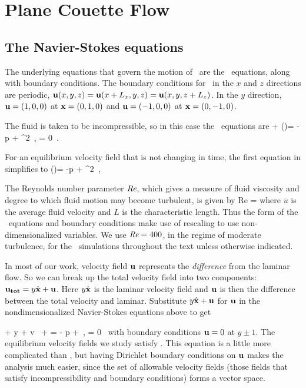 \documentclass[letter,12pt,openany]{article}
\begin{document}
\section{\centering Plane Couette Flow}
\label{sec:PCF}

\subsection{The Navier-Stokes equations}
\label{sec:NS}
 The underlying equations
that govern the motion of \pCf\ are the \NS\ equations,
along with boundary conditions. The boundary conditions for \pCf\ in the $x$
and $z$ directions are periodic,
 $ {\bf u}(x, y, z) = {\bf u}(x+L_x, y, z) =
{\bf u}(x, y, z + L_z) $.
 In the $y$ direction,
 ${\bf u} = (1,0,0)$ at ${\bf x} = (0,1,0)$ and ${\bf u} = (-1,0,0)$ at ${\bf x} =
 (0,-1,0)$.

 The fluid is taken to be incompressible, so in this case the
 \NS\ equations are
 \beq
  + (\bu \cdot \nabla)\bu = -\nabla p +  \nabla^{2} \bu
    \,,\qquad
\nabla \cdot \bu  = 0 \,. \label{eqn:NavierStokes} \eeq 



For an equilibrium velocity field that is not changing in time, the first equation in
 simplifies to \beq
 (\bu \cdot \nabla)\bu = -\nabla p +  \nabla^{2} \bu
    \,,\qquad \label{eqn:NavierStokes2} \eeq
 
  The Reynolds number parameter $\textit{Re}$, which gives a measure of fluid viscosity and degree to which fluid motion may become turbulent, is given by \beq Re = 
\eeq where $\overline{u}$ is the average fluid velocity and $L$ is
the characteristic length. Thus the form of the \NS\ equations and boundary conditions make use of rescaling to use non-dimensionalized variables. 
We use $\textit{Re} = 400$, in the regime of moderate turbulence, for the \pCf\ simulations throughout the text unless otherwise indicated.

In most of our work, velocity field  ${\bf u}$
represents the {\em difference} from the laminar flow. 
So we can break up the total velocity field into two components: ${\bf u_{tot}} =
y \hat{\bf x} + {\bf u}$. Here $y \hat{\bf x}$ is the laminar velocity
field and ${\bf u}$ is then the difference between the total velocity and
laminar. Substitute $y \hat{\bf x} + {\bf u}$ for ${\bf u}$ in the
nondimensionalized Navier-Stokes equations above to get

\beq
    + y  
    + v \, 
    + \bu \cdot \bnabla \bu
=
    - \bnabla p
    + 
        \lapl \bu  \,, \quad \nabla \cdot \bu = 0
\, \label{NavStokesDiff}
\eeq
with boundary conditions ${\bf u} = 0 $ at $y \pm 1$.
The equilibrium velocity fields we study satisfy . This equation is a little more complicated than
, but having Dirichlet boundary conditions on
${\bf u}$ makes the analysis much easier, since the set of allowable velocity fields (those fields that satisfy incompressibility and boundary
conditions)
forms a vector space. \\
\end{document}
